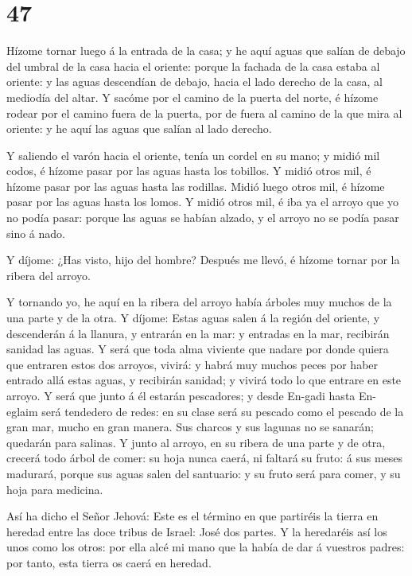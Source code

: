 \hypertarget{section-46}{%
\section{47}\label{section-46}}

 Hízome tornar luego á la entrada de la casa; y he aquí
aguas que salían de debajo del umbral de la casa hacia el oriente:
porque la fachada de la casa estaba al oriente: y las aguas descendían
de debajo, hacia el lado derecho de la casa, al mediodía del altar.
 Y sacóme por el camino de la puerta del norte, é hízome
rodear por el camino fuera de la puerta, por de fuera al camino de la
que mira al oriente: y he aquí las aguas que salían al lado derecho.

 Y saliendo el varón hacia el oriente, tenía un cordel en su
mano; y midió mil codos, é hízome pasar por las aguas hasta los
tobillos.  Y midió otros mil, é hízome pasar por las aguas
hasta las rodillas. Midió luego otros mil, é hízome pasar por las aguas
hasta los lomos.  Y midió otros mil, é iba ya el arroyo que
yo no podía pasar: porque las aguas se habían alzado, y el arroyo no se
podía pasar sino á nado.

 Y díjome: ¿Has visto, hijo del hombre? Después me llevó, é
hízome tornar por la ribera del arroyo.

 Y tornando yo, he aquí en la ribera del arroyo había
árboles muy muchos de la una parte y de la otra.  Y díjome:
Estas aguas salen á la región del oriente, y descenderán á la llanura, y
entrarán en la mar: y entradas en la mar, recibirán sanidad las aguas.
 Y será que toda alma viviente que nadare por donde quiera
que entraren estos dos arroyos, vivirá: y habrá muy muchos peces por
haber entrado allá estas aguas, y recibirán sanidad; y vivirá todo lo
que entrare en este arroyo.  Y será que junto á él estarán
pescadores; y desde En-gadi hasta En-eglaim será tendedero de redes: en
su clase será su pescado como el pescado de la gran mar, mucho en gran
manera.  Sus charcos y sus lagunas no se sanarán; quedarán
para salinas.  Y junto al arroyo, en su ribera de una parte
y de otra, crecerá todo árbol de comer: su hoja nunca caerá, ni faltará
su fruto: á sus meses madurará, porque sus aguas salen del santuario: y
su fruto será para comer, y su hoja para medicina.

 Así ha dicho el Señor Jehová: Este es el término en que
partiréis la tierra en heredad entre las doce tribus de Israel: José dos
partes.  Y la heredaréis así los unos como los otros: por
ella alcé mi mano que la había de dar á vuestros padres: por tanto, esta
tierra os caerá en heredad.

